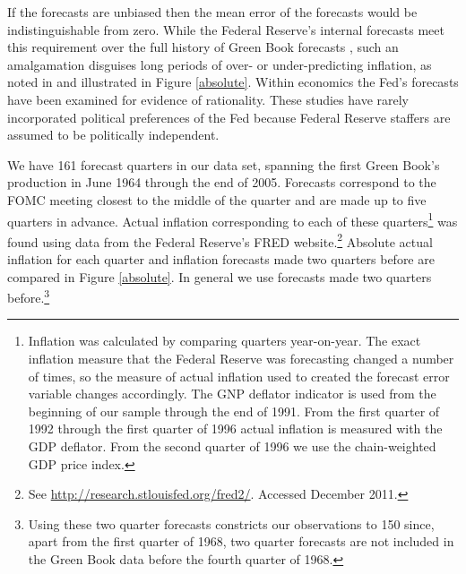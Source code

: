 \documentclass[a4paper]{article}\usepackage{graphicx, color}
\begin{document}
If the forecasts are unbiased then the mean error of the forecasts would be indistinguishable from zero. While the Federal Reserve's internal forecasts meet this requirement over the full history of Green Book forecasts \citep{Romer2000}, such an amalgamation disguises long periods of over- or under-predicting inflation, as noted in \cite{Capistran2006} and illustrated in Figure \ref{absolute}. Within economics the Fed's forecasts have been examined for evidence of rationality. These studies have rarely incorporated political preferences of the Fed because Federal Reserve staffers are assumed to be politically independent.

We have 161 forecast quarters in our data set, spanning the first Green Book's production in June 1964 through the end of 2005. Forecasts correspond to the FOMC meeting closest to the middle of the quarter and are made up to five quarters in advance. Actual inflation corresponding to each of these quarters\footnote{Inflation was calculated by comparing quarters year-on-year. The exact inflation measure that the Federal Reserve was forecasting changed a number of times, so the measure of actual inflation used to created the forecast error variable changes accordingly. The GNP deflator indicator is used from the beginning of our sample through the end of 1991. From the first quarter of 1992 through the first quarter of 1996 actual inflation is measured with the GDP deflator.  From the second quarter of 1996 we use the chain-weighted GDP price index. } was found using data from the Federal Reserve's FRED website.\footnote{See \url{http://research.stlouisfed.org/fred2/}. Accessed December 2011.} Absolute actual inflation for each quarter and inflation forecasts made two quarters before are compared in Figure \ref{absolute}. In general we use forecasts made two quarters before.\footnote{Using these two quarter forecasts constricts our observations to 150 since, apart from the first quarter of 1968, two quarter forecasts are not included in the Green Book data before the fourth quarter of 1968.} 
\end{document}
